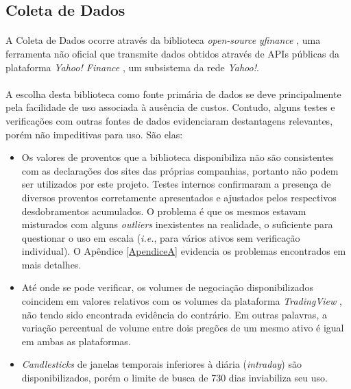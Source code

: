 \FloatBarrier
\subsection{Coleta de Dados}
\label{coleta_de_dados}

\paragraph{} A Coleta de Dados ocorre através da biblioteca \textit{open-source} \textit{yfinance} \cite{yfinance}, uma ferramenta não oficial que transmite dados obtidos através de APIs públicas da plataforma \textit{Yahoo! Finance} \cite{yahoo_finance}, um subsistema da rede \textit{Yahoo!}.

\paragraph{} A escolha desta biblioteca como fonte primária de dados se deve principalmente pela facilidade de uso associada à ausência de custos. Contudo, alguns testes e verificações com outras fontes de dados evidenciaram destantagens relevantes, porém não impeditivas para uso. São elas:

\begin{itemize}
    \item Os valores de proventos que a biblioteca disponibiliza não são consistentes com as declarações dos sites das próprias companhias, portanto não podem ser utilizados por este projeto. Testes internos confirmaram a presença de diversos proventos corretamente apresentados e ajustados pelos respectivos desdobramentos acumulados. O problema é que os mesmos estavam misturados com alguns \textit{outliers} inexistentes na realidade, o suficiente para questionar o uso em escala (\textit{i.e.}, para vários ativos sem verificação individual). O Apêndice \ref{ApendiceA} evidencia os problemas encontrados em mais detalhes.

    \item Até onde se pode verificar, os volumes de negociação disponibilizados coincidem em valores relativos com os volumes da plataforma \textit{TradingView} \cite{tradingview}, não tendo sido encontrada evidência do contrário. Em outras palavras, a variação percentual de volume entre dois pregões de um mesmo ativo é igual em ambas as plataformas.

    \item \textit{Candlesticks} de janelas temporais inferiores à diária (\textit{intraday}) são disponibilizados, porém o limite de busca de 730 dias inviabiliza seu uso.
\end{itemize}

